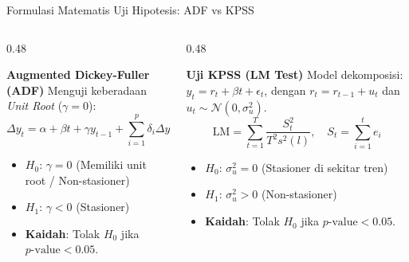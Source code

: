 \documentclass[aspectratio=169, 10pt]{beamer}
\begin{document}
\begin{frame}{Formulasi Matematis Uji Hipotesis: ADF vs KPSS}
    \begin{columns}[T]
        \begin{column}{0.48\textwidth}
            \begin{block}{\textbf{Augmented Dickey-Fuller (ADF)}}
                Menguji keberadaan \textit{Unit Root} ($\gamma = 0$):
                \[
                    \Delta y_t = \alpha + \beta t + \gamma y_{t-1} + \sum_{i=1}^p \delta_i \Delta y_{t-i} + \epsilon_t
                \]
                \begin{itemize}
                    \item $H_0$: $\gamma = 0$ (Memiliki unit root / Non-stasioner)
                    \item $H_1$: $\gamma < 0$ (Stasioner)
                    \item \textbf{Kaidah}: Tolak $H_0$ jika $p\text{-value} < 0.05$.
                \end{itemize}
            \end{block}
        \end{column}
        \begin{column}{0.48\textwidth}
            \begin{block}{\textbf{Uji KPSS (LM Test)}}
                Model dekomposisi: $y_t = r_t + \beta t + \epsilon_t$, dengan $r_t = r_{t-1} + u_t$ dan $u_t \sim \mathcal{N}(0, \sigma_u^2)$.
                \[
                    \text{LM} = \sum_{t=1}^T \frac{S_t^2}{T^2 s^2(l)}, \quad S_t = \sum_{i=1}^t e_i
                \]
                \begin{itemize}
                    \item $H_0$: $\sigma_u^2 = 0$ (Stasioner di sekitar tren)
                    \item $H_1$: $\sigma_u^2 > 0$ (Non-stasioner)
                    \item \textbf{Kaidah}: Tolak $H_0$ jika $p\text{-value} < 0.05$.
                \end{itemize}
            \end{block}
        \end{column}
    \end{columns}
\end{frame}
\end{document}
